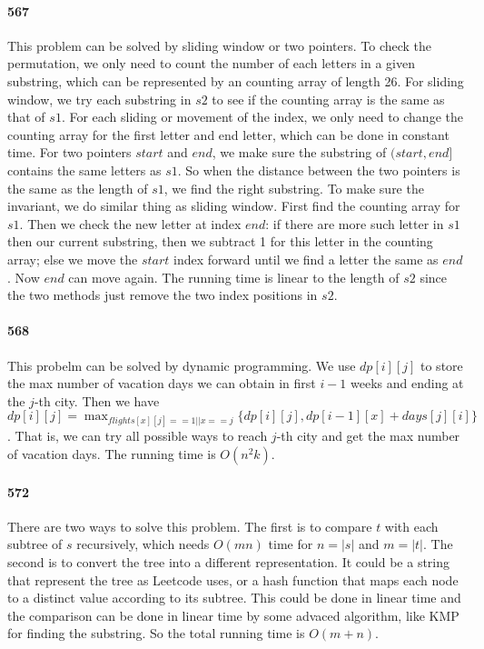 \documentclass[11pt]{article}
\begin{document}
\paragraph{567}
This problem can be solved by sliding window or two pointers.
To check the permutation, we only need to count the number of each letters in a given substring, which can be represented by an 
counting array of length 26.
For sliding window, we try each substring in $s2$ to see if the counting array is the same as that of $s1$.
For each sliding or movement of the index, we only need to change the counting array for the first letter and end letter, which
can be done in constant time.
For two pointers $start$ and $end$, we make sure the substring of $(start, end]$ contains the same letters as $s1$. So when the 
distance between the two pointers is the same as the length of $s1$, we find the right substring. To make sure the invariant, 
we do similar thing as sliding window. First find the counting array for $s1$. Then we check the new letter at index $end$: if
there are more such letter in $s1$ then our current substring, then we subtract 1 for this letter in the counting array; else
we move the $start$ index forward until we find a letter the same as $end$.
Now $end$ can move again.
The running time is linear to the length of $s2$ since the two methods just remove the two index positions in $s2$.

\paragraph{568}
This probelm can be solved by dynamic programming.
We use $dp[i][j]$ to store the max number of vacation days we can obtain in first $i-1$ weeks and ending at the $j$-th city.
Then we have $dp[i][j] = \max_{flights[x][j] == 1 || x == j} \{ dp[i][j], dp[i-1][x] + days[j][i] \}$. 
That is, we can try all possible ways to reach $j$-th city and get the max number of vacation days.
The running time is $O(n^2 k)$.

\paragraph{572}
There are two ways to solve this problem. The first is to compare $t$ with each subtree of $s$ recursively, which needs $O(mn)$ time for $n = |s|$ and $m = |t|$. The second is to convert the tree into a different representation. It could be a
string that represent the tree as Leetcode uses, or a hash function that maps each node to a distinct value according to its
subtree. This could be done in linear time and the comparison can be done in linear time by some advaced algorithm, like KMP 
for finding the substring. So the total running time is $O(m + n)$.
\end{document}
